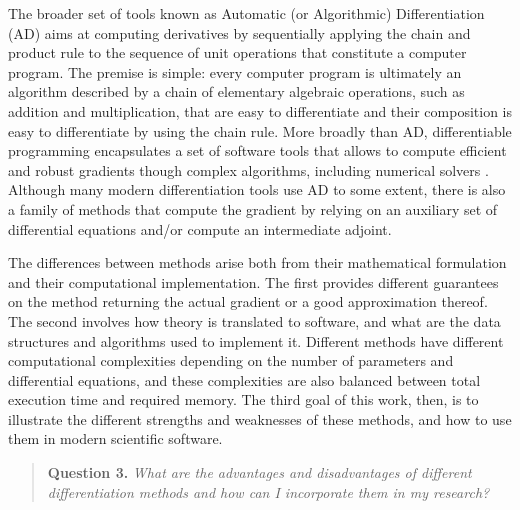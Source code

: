 The broader set of tools known as Automatic (or Algorithmic) Differentiation (AD) aims at computing derivatives by sequentially applying the chain and product rule to the sequence of unit operations that constitute a computer program\cite{Griewank:2008kh, Naumann.2011}. 
The premise is simple: every computer program is ultimately an algorithm described by a chain of elementary algebraic operations, such as addition and multiplication, that are easy to differentiate and their composition is easy to differentiate by using the chain rule\cite{Giering:1998in}. 
More broadly than AD, differentiable programming encapsulates a set of software tools that allows to compute efficient and robust gradients though complex algorithms, including numerical solvers \cite{Innes_Zygote}. 
Although many modern differentiation tools use AD to some extent, there is also a family of methods that compute the gradient by relying on an auxiliary set of differential equations and/or compute an intermediate adjoint. 

The differences between methods arise both from their mathematical formulation and their computational implementation. 
The first provides different guarantees on the method returning the actual gradient or a good approximation thereof. 
The second involves how theory is translated to software, and what are the data structures and algorithms used to implement it. 
Different methods have different computational complexities depending on the number of parameters and differential equations, and these complexities are also balanced between total execution time and required memory. 
The third goal of this work, then, is to illustrate the different strengths and weaknesses of these methods, and how to use them in modern scientific software. 
\begin{quote}
    \textbf{Question 3. }
    \textit{What are the advantages and disadvantages of different differentiation methods and how can I incorporate them in my research?}
\end{quote}

